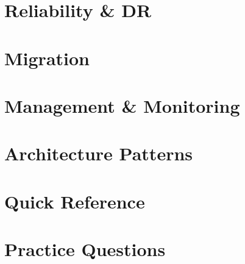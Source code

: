 \documentclass[12pt, a4paper]{article}
\begin{document}



\part{Reliability \& DR}



\part{Migration}



\part{Management \& Monitoring}





\part{Architecture Patterns}



\part{Quick Reference}



\part{Practice Questions}


\end{document}
